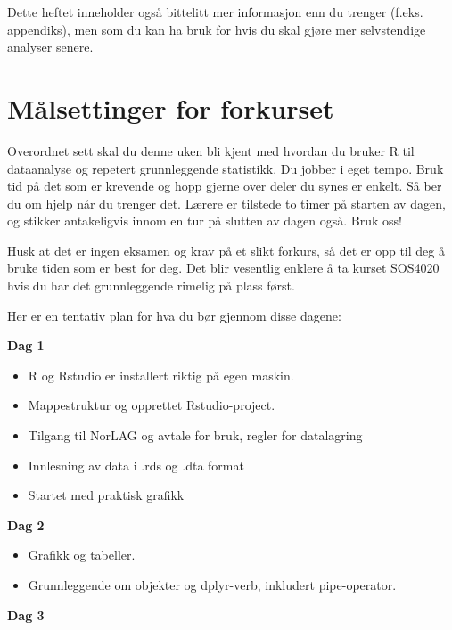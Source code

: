 \documentclass[
  letterpaper,
  DIV=11,
  numbers=noendperiod]{scrreprt}
\providecommand{\tightlist}{%
  \setlength{\itemsep}{0pt}\setlength{\parskip}{0pt}}\usepackage{longtable,booktabs,array}
\theoremstyle{definition}
\theoremstyle{remark}
\begin{document}
Dette heftet inneholder også bittelitt mer informasjon enn du trenger
(f.eks. appendiks), men som du kan ha bruk for hvis du skal gjøre mer
selvstendige analyser senere.

\hypertarget{muxe5lsettinger-for-forkurset}{%
\section*{Målsettinger for
forkurset}\label{muxe5lsettinger-for-forkurset}}


Overordnet sett skal du denne uken bli kjent med hvordan du bruker R til
dataanalyse og repetert grunnleggende statistikk. Du jobber i eget
tempo. Bruk tid på det som er krevende og hopp gjerne over deler du
synes er enkelt. Så ber du om hjelp når du trenger det. Lærere er
tilstede to timer på starten av dagen, og stikker antakeligvis innom en
tur på slutten av dagen også. Bruk oss!

Husk at det er ingen eksamen og krav på et slikt forkurs, så det er opp
til deg å bruke tiden som er best for deg. Det blir vesentlig enklere å
ta kurset SOS4020 hvis du har det grunnleggende rimelig på plass først.

Her er en tentativ plan for hva du bør gjennom disse dagene:

\textbf{Dag 1}

\begin{itemize}
\tightlist
\item
  R og Rstudio er installert riktig på egen maskin.
\item
  Mappestruktur og opprettet Rstudio-project.
\item
  Tilgang til NorLAG og avtale for bruk, regler for datalagring
\item
  Innlesning av data i .rds og .dta format
\item
  Startet med praktisk grafikk
\end{itemize}

\textbf{Dag 2}

\begin{itemize}
\tightlist
\item
  Grafikk og tabeller.
\item
  Grunnleggende om objekter og dplyr-verb, inkludert pipe-operator.
\end{itemize}

\textbf{Dag 3}
\end{document}

